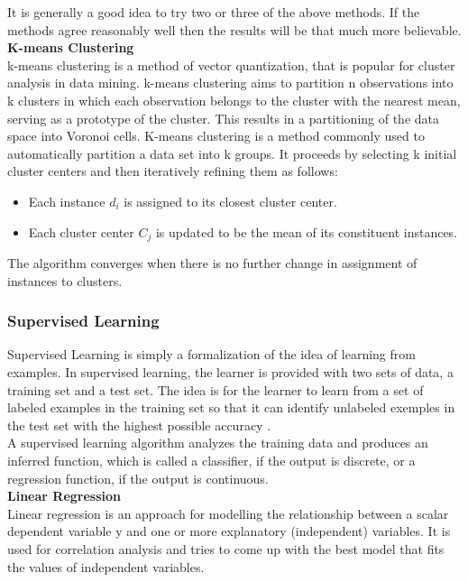 It is generally a good idea to try two or three of the above methods. If the methods agree reasonably well then the results will be that much more believable.\\

\textbf{\normalsize{K-means Clustering}}\\

k-means clustering is a method of vector quantization, that is popular for cluster analysis in data mining. k-means clustering aims to partition n observations into k clusters in which each observation belongs to the cluster with the nearest mean, serving as a prototype of the cluster. This results in a partitioning of the data space into Voronoi cells.
K-means clustering is a method commonly used to automatically partition a data set into k groups. It proceeds by selecting k initial cluster centers and then iteratively refining them as follows:
\begin{itemize}
\item Each instance $d_i$ is assigned to its closest cluster center.
\item Each cluster center $C_j$ is updated to be the mean of its constituent instances.
\end{itemize}

The algorithm converges when there is no further change in assignment of instances to clusters.
\newpage
\subsubsection{Supervised Learning}
Supervised Learning is simply a formalization of the idea of learning from examples. In supervised learning, the learner is provided with two sets of data, a training set and a test set. The idea is for the learner to learn from a set of labeled examples in the training set so that it can identify unlabeled exemples in the test set with the highest possible accuracy \cite{cite21}.\\

A supervised learning algorithm analyzes the training data and produces an inferred function, which is called a classifier, if the output is discrete, or a regression function, if the output is continuous. \\

\textbf{\normalsize{Linear Regression}}\\

Linear regression is an approach for modelling the relationship between a scalar dependent variable y and one or more explanatory (independent) variables. It is used for correlation analysis and tries to come up with the best model that fits the values of independent variables. \\

